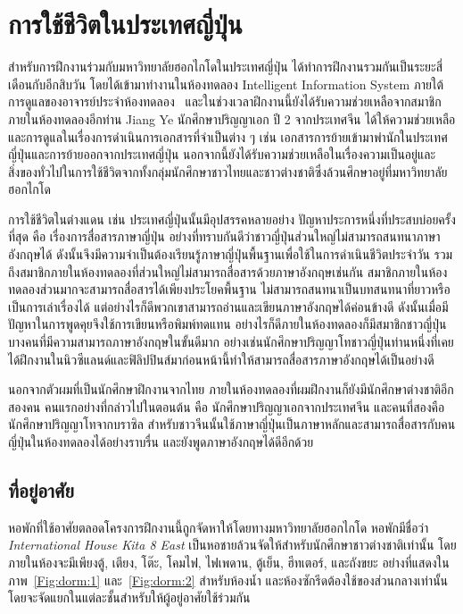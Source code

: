 \chapter{การใช้ชีวิตในประเทศญี่ปุ่น}

สำหรับการฝึกงานร่วมกับมหาวิทยาลัยฮอกไกโดในประเทศญี่ปุ่น ได้ทำการฝึกงานรวมกันเป็นระยะสี่เดือนกับอีกสิบวัน โดยได้เข้ามาทำงานในห้องทดลอง Intelligent Information System ภายใต้การดูแลของอาจารย์ประจำห้องทดลอง \Exami \ และในช่วงเวลาฝึกงานนี้ยังได้รับความช่วยเหลือจากสมาชิกภายในห้องทดลองอีกท่าน Jiang Ye นักศึกษาปริญญาเอก ปี 2 จากประเทศจีน ได้ให้ความช่วยเหลือและการดูแลในเรื่องการดำเนินการเอกสารที่จำเป็นต่าง ๆ เช่น เอกสารการย้ายเข้ามาพำนักในประเทศญี่ปุ่นและการย้ายออกจากประเทศญี่ปุ่น นอกจากนี้ยังได้รับความช่วยเหลือในเรื่องความเป็นอยู่และสิ่งของทั่วไปในการใช้ชีวิตจากทั้งกลุ่มนักศึกษาชาวไทยและชาวต่างชาติซึ่งล้วนศึกษาอยู่ที่มหาวิทยาลัยฮอกไกโด

การใช้ชีวิตในต่างแดน เช่น ประเทศญี่ปุ่นนั้นมีอุปสรรคหลายอย่าง ปัญหาประการหนึ่งที่ประสบบ่อยครั้งที่สุด คือ เรื่องการสื่อสารภาษาญี่ปุ่น อย่างที่ทราบกันดีว่าชาวญี่ปุ่นส่วนใหญ่ไม่สามารถสนทนาภาษาอังกฤษได้ ดังนั้นจึงมีความจำเป็นต้องเรียนรู้ภาษาญี่ปุ่นพื้นฐานเพื่อใช้ในการดำเนินชีวิตประจำวัน รวมถึงสมาชิกภายในห้องทดลองที่ส่วนใหญ่ไม่สามารถสื่อสารด้วยภาษาอังกฤษเช่นกัน สมาชิกภายในห้องทดลองส่วนมากจะสามารถสื่อสารได้เพียงประโยคพื้นฐาน ไม่สามารถสนทนาเป็นบทสนทนาที่ยาวหรือเป็นการเล่าเรื่องได้ แต่อย่างไรก็ดีพวกเขาสามารถอ่านและเขียนภาษาอังกฤษได้ค่อนข้างดี ดังนั้นเมื่อมีปัญหาในการพูดคุยจึงใช้การเขียนหรือพิมพ์ทดแทน อย่างไรก็ดีภายในห้องทดลองก็มีสมาชิกชาวญี่ปุ่นบางคนที่มีความสามารถภาษาอังกฤษในขั้นดีมาก อย่างเช่นนักศึกษาปริญญาโทชาวญี่ปุ่นท่านหนึ่งที่เคยได้ฝึกงานในนิวซีแลนด์และฟิลิปปินส์มาก่อนหน้านี้ทำให้สามารถสื่อสารภาษาอังกฤษได้เป็นอย่างดี

นอกจากตัวผมที่เป็นนักศึกษาฝึกงานจากไทย ภายในห้องทดลองที่ผมฝึกงานก็ยังมีนักศึกษาต่างชาติอีกสองคน คนแรกอย่างที่กล่าวไปในตอนต้น คือ นักศึกษาปริญญาเอกจากประเทศจีน และคนที่สองคือนักศึกษาปริญญาโทจากบราซิล สำหรับชาวจีนนั้นใช้ภาษาญี่ปุ่นเป็นภาษาหลักและสามารถสื่อสารกับคนญี่ปุ่นในห้องทดลองได้อย่างราบรื่น และยังพูดภาษาอังกฤษได้ดีอีกด้วย

\section{ที่อยู่อาศัย}

หอพักที่ใช้อาศัยตลอดโครงการฝึกงานนี้ถูกจัดหาให้โดยทางมหาวิทยาลัยฮอกไกโด หอพักมีชื่อว่า \textit{International House Kita 8 East} เป็นหอชายล้วนจัดให้สำหรับนักศึกษาชาวต่างชาติเท่านั้น โดยภายในห้องจะมีเพียงตู้, เตียง, โต๊ะ, โคมไฟ, ไฟเพดาน, ตู้เย็น, ฮีทเตอร์, และถังขยะ อย่างที่แสดงในภาพ~\ref{Fig:dorm:1} และ~\ref{Fig:dorm:2} สำหรับห้องน้ำ และห้องซักรีดต้องใช้ของส่วนกลางเท่านั้น โดยจะจัดแยกในแต่ละชั้นสำหรับให้ผู้อยู่อาศัยใช้ร่วมกัน

